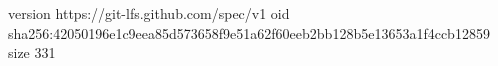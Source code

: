 version https://git-lfs.github.com/spec/v1
oid sha256:42050196e1c9eea85d573658f9e51a62f60eeb2bb128b5e13653a1f4ccb12859
size 331
